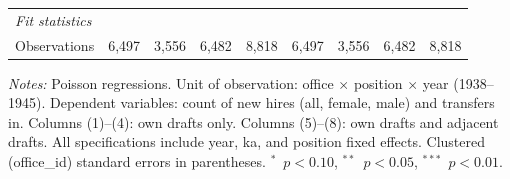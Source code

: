 \begin{table}[htbp]
\begin{threeparttable}
\begin{tabular}{lcccccccc}
   \midrule
   \emph{Fit statistics}\\
   Observations           & 6,497          & 3,556          & 6,482          & 8,818          & 6,497          & 3,556          & 6,482          & 8,818\\  
   \midrule \midrule
\end{tabular}
\par\endgroup
\begin{tablenotes}[flushleft]
\footnotesize
\item \textit{Notes:} Poisson regressions. Unit of observation: office $\times$ position $\times$ year (1938--1945). Dependent variables: count of new hires (all, female, male) and transfers in. Columns (1)--(4): own drafts only. Columns (5)--(8): own drafts and adjacent drafts. All specifications include year, ka, and position fixed effects. Clustered (office\_id) standard errors in parentheses. $^{*}$~$p<0.10$, $^{**}$~$p<0.05$, $^{***}$~$p<0.01$.
\end{tablenotes}
\end{threeparttable}
\end{table}
